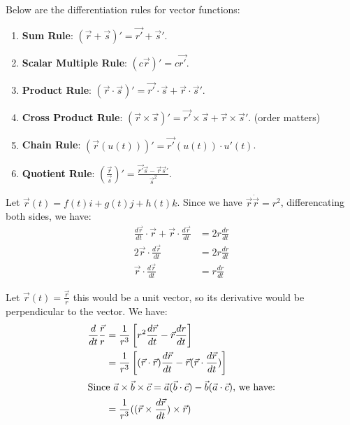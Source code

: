 \documentclass[11pt]{article}
\begin{document}
\begin{theorem}
    Below are the differentiation rules for vector functions:
    \begin{enumerate}
        \item \textbf{Sum Rule}: $(\vec{r} + \vec{s})' = \vec{r'} + \vec{s}'$.
        \item \textbf{Scalar Multiple Rule}: $(c\vec{r})' = c\vec{r'}$.
        \item \textbf{Product Rule}: $(\vec{r} \cdot \vec{s})' = \vec{r'} \cdot \vec{s} + \vec{r} \cdot \vec{s}'$.
        \item \textbf{Cross Product Rule}: $(\vec{r} \times \vec{s})' = \vec{r'} \times \vec{s} + \vec{r} \times \vec{s}'$. (order matters)
        \item \textbf{Chain Rule}: $(\vec{r}(u(t)))' = \vec{r'}(u(t)) \cdot u'(t)$.
        \item \textbf{Quotient Rule}: $\left( \frac{\vec{r}}{\vec{s}} \right)' = \frac{\vec{r'} \vec{s} - \vec{r} \vec{s}'}{\vec{s}^2}$.
    \end{enumerate}
\end{theorem}
\begin{example}
    Let $\vec{r}(t) = f(t)i + g(t)j + h(t)k$. Since we have $\vec{r} \dot \vec{r} = r^2$, differencating both sides, we have:
    \begin{align*}
        \frac{d\vec{r}}{dt} \cdot \vec{r} + \vec{r} \cdot \frac{d\vec{r}}{dt} &= 2r \frac{dr}{dt} \\
        2\vec{r} \cdot \frac{d\vec{r}}{dt} &= 2r \frac{dr}{dt} \\
        \vec{r} \cdot \frac{d\vec{r}}{dt} &= r \frac{dr}{dt}
    \end{align*}
\end{example}
\begin{example}
    Let $\vec{r}(t) = \frac{\vec{r}}{r}$ this would be a unit vector, so its derivative would be perpendicular to the vector. We have:
    \begin{align*}
       \frac{d}{dt}\frac{\vec{r}}{r} &= \frac{1}{r^3}\left[ r^2\frac{d\vec{r}}{dt} - \vec{r}\frac{dr}{dt} \right] \\
         &= \frac{1}{r^3}\left[ (\vec{r} \cdot \vec{r})\frac{d\vec{r}}{dt} - \vec{r}(\vec{r} \cdot \frac{d\vec{r}}{dt}) \right] \\
         \intertext{Since $\vec{a} \times \vec{b} \times \vec{c} = \vec{a}(\vec{b} \cdot \vec{c}) - \vec{b}(\vec{a} \cdot \vec{c})$, we have:}
         &= \frac{1}{r^3}((\vec{r} \times \frac{d\vec{r}}{dt}) \times \vec{r}) 
    \end{align*}
\end{example}
\end{document}

